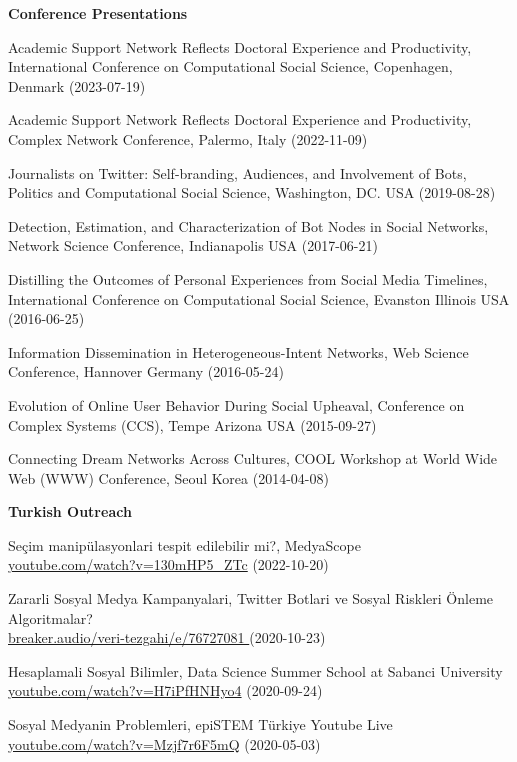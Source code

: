 \documentclass[10pt]{article}
\newenvironment{innerlist}[1][\enskip\textbullet]%
        {\begin{compactitem}[#1]}{\end{compactitem}}
\begin{document}
\vspace{3mm}
\textbf{Conference Presentations}
\begin{innerlist}
\item Academic Support Network Reflects Doctoral Experience and Productivity, International Conference on Computational Social Science, Copenhagen, Denmark (2023-07-19)
\item Academic Support Network Reflects Doctoral Experience and Productivity, Complex Network Conference, Palermo, Italy (2022-11-09)
\item Journalists on Twitter: Self-branding, Audiences, and Involvement of Bots, Politics and Computational Social Science, Washington, DC. USA (2019-08-28)
\item Detection, Estimation, and Characterization of Bot Nodes in Social Networks, Network Science Conference, Indianapolis USA (2017-06-21) 
\item Distilling the Outcomes of Personal Experiences from Social Media Timelines, International Conference on Computational Social Science, Evanston Illinois USA (2016-06-25)
\item Information Dissemination in Heterogeneous-Intent Networks, Web Science Conference, Hannover Germany (2016-05-24)
\item Evolution of Online User Behavior During Social Upheaval, Conference on Complex Systems (CCS), Tempe Arizona USA (2015-09-27)
\item Connecting Dream Networks Across Cultures, COOL Workshop at World Wide Web (WWW) Conference, Seoul Korea (2014-04-08)
\end{innerlist}

\vspace{3mm}
\textbf{Turkish Outreach}
\begin{innerlist}
\item Seçim manipülasyonlari tespit edilebilir mi?, MedyaScope \\ \url{youtube.com/watch?v=130mHP5_ZTc} (2022-10-20)
\item Zararli Sosyal Medya Kampanyalari, Twitter Botlari ve Sosyal Riskleri Önleme Algoritmalar? \\ \url{breaker.audio/veri-tezgahi/e/76727081 } (2020-10-23)
\item Hesaplamali Sosyal Bilimler, Data Science Summer School at Sabanci University \\ \url{youtube.com/watch?v=H7iPfHNHyo4} (2020-09-24)
\item Sosyal Medyanin Problemleri, epiSTEM Türkiye Youtube Live \\ \url{youtube.com/watch?v=Mzjf7r6F5mQ} (2020-05-03)
\end{innerlist}
\end{document}

